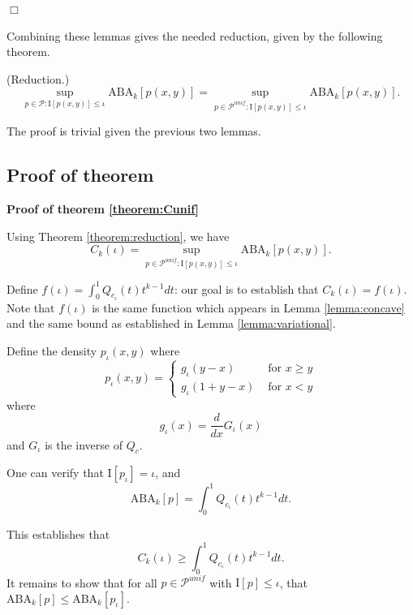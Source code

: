 $\Box$


Combining these lemmas gives the needed reduction, given by the following theorem.

\begin{theorem}\label{theorem:reduction} (Reduction.)
\[
\sup_{p \in \mathcal{P}: \text{I}[p(x,y)] \leq \iota} \text{ABA}_k[p(x,y)] = 
\sup_{p \in \mathcal{P}^{unif}: \text{I}[p(x,y)] \leq \iota} \text{ABA}_k[p(x,y)].
\]
\end{theorem}

The proof is trivial given the previous two lemmas.



\subsection{Proof of theorem}

\textbf{Proof of theorem \ref{theorem:Cunif}}

Using Theorem \ref{theorem:reduction}, we have
\[
C_k(\iota) = \sup_{p \in \mathcal{P}^{unif}: \text{I}[p(x,y)] \leq \iota} \text{ABA}_k[p(x,y)].
\]

Define $f(\iota) = \int_0^1 Q_{c_\iota}(t) t^{k-1} dt$: our goal is to
establish that $C_k(\iota) = f(\iota)$.  
Note that $f(\iota)$
is the same function which appears in Lemma \ref{lemma:concave} and
the same bound as established in Lemma \ref{lemma:variational}.

Define the density $p_\iota(x, y)$ where
\[
p_\iota(x, y) = \begin{cases}
g_\iota(y - x) & \text{ for } x\geq y\\
g_\iota(1 + y - x) & \text{ for } x < y
\end{cases}
\]
where
\[
g_\iota(x) = \frac{d}{dx}G_\iota(x)
\]
and $G_\iota$ is the inverse of $Q_c$.

One can verify that $\text{I}[p_\iota] = \iota$, and 
\[
\text{ABA}_k[p] = \int_0^1 Q_{c_\iota}(t) t^{k-1} dt.
\]

This establishes that
\[
C_k(\iota) \geq \int_0^1 Q_{c_\iota}(t) t^{k-1} dt.
\]
It remains to show that for all $p \in \mathcal{P}^{unif}$ with
$\text{I}[p] \leq \iota$, that $\text{ABA}_k[p] \leq \text{ABA}_k[p_\iota]$.

